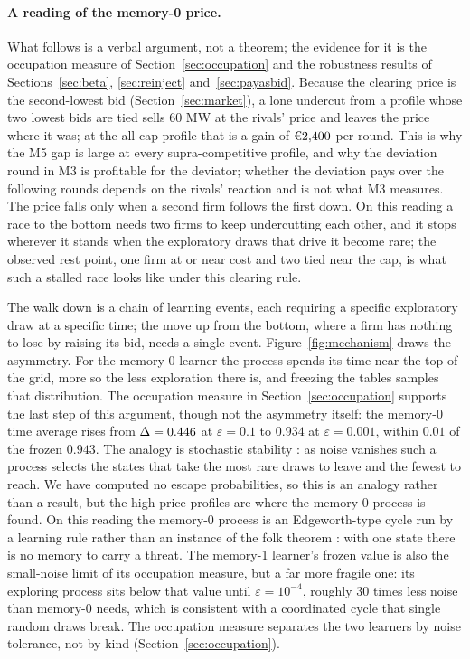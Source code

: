 \paragraph{A reading of the memory-0 price.}
What follows is a verbal argument, not a theorem; the evidence for it is the occupation measure of Section~\ref{sec:occupation} and the robustness results of Sections~\ref{sec:beta}, \ref{sec:reinject} and~\ref{sec:payasbid}. Because the clearing price is the second-lowest bid (Section~\ref{sec:market}), a lone undercut from a profile whose two lowest bids are tied sells 60 MW at the rivals' price and leaves the price where it was; at the all-cap profile that is a gain of $\eur{2{,}400}$ per round. This is why the M5 gap is large at every supra-competitive profile, and why the deviation round in M3 is profitable for the deviator; whether the deviation pays over the following rounds depends on the rivals' reaction and is not what M3 measures. The price falls only when a second firm follows the first down. On this reading a race to the bottom needs two firms to keep undercutting each other, and it stops wherever it stands when the exploratory draws that drive it become rare; the observed rest point, one firm at or near cost and two tied near the cap, is what such a stalled race looks like under this clearing rule. 

The walk down is a chain of learning events, each requiring a specific exploratory draw at a specific time; the move up from the bottom, where a firm has nothing to lose by raising its bid, needs a single event. Figure~\ref{fig:mechanism} draws the asymmetry. For the memory-0 learner the process spends its time near the top of the grid, more so the less exploration there is, and freezing the tables samples that distribution. The occupation measure in Section~\ref{sec:occupation} supports the last step of this argument, though not the asymmetry itself: the memory-0 time average rises from $\Delta = 0.446$ at $\varepsilon = 0.1$ to $0.934$ at $\varepsilon = 0.001$, within $0.01$ of the frozen $0.943$. The analogy is stochastic stability \citep{kandori1993,young1993}: as noise vanishes such a process selects the states that take the most rare draws to leave and the fewest to reach. We have computed no escape probabilities, so this is an analogy rather than a result, but the high-price profiles are where the memory-0 process is found. On this reading the memory-0 process is an Edgeworth-type cycle run by a learning rule \citep{maskin1988} rather than an instance of the folk theorem \citep{fudenberg1986}: with one state there is no memory to carry a threat. The memory-1 learner's frozen value is also the small-noise limit of its occupation measure, but a far more fragile one: its exploring process sits below that value until $\varepsilon = 10^{-4}$, roughly 30 times less noise than memory-0 needs, which is consistent with a coordinated cycle that single random draws break. The occupation measure separates the two learners by noise tolerance, not by kind (Section~\ref{sec:occupation}).

